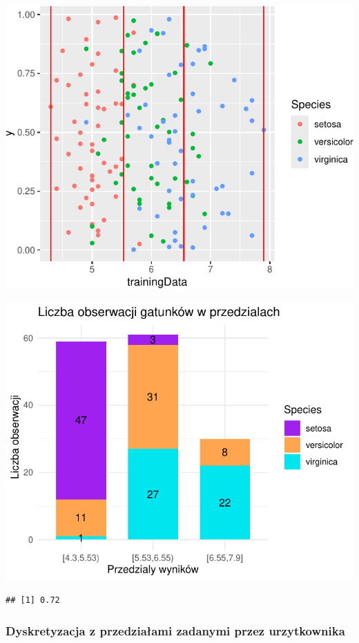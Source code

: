 \documentclass[
  12pt,
]{article}
\begin{document}
\begin{center}\includegraphics{Sprawozdanie2_files/figure-latex/kMeans_najg-2} \end{center}

\begin{center}\includegraphics{Sprawozdanie2_files/figure-latex/tabela_kondygnacji_3_najg-1} \end{center}

\begin{verbatim}
## [1] 0.72
\end{verbatim}

\subsubsection{Dyskretyzacja z przedziałami zadanymi przez
urzytkownika}\label{dyskretyzacja-z-przedziaux142ami-zadanymi-przez-urzytkownika}
\end{document}
